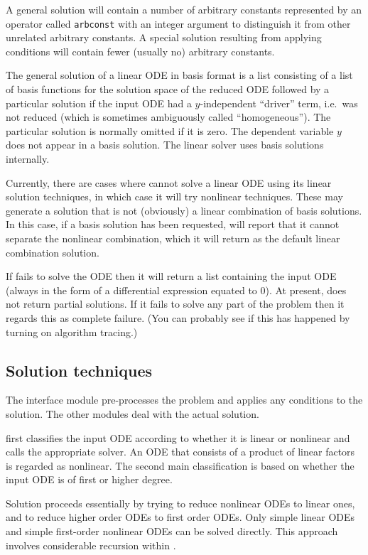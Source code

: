 A general solution will contain a number of arbitrary constants
represented by an operator called \texttt{arbconst} with an integer
argument to distinguish it from other unrelated arbitrary constants.
A special solution resulting from applying conditions will contain
fewer (usually no) arbitrary constants.

The general solution of a linear ODE in basis format is a list
consisting of a list of basis functions for the solution space of the
reduced ODE followed by a particular solution if the input ODE had a
$y$-independent ``driver'' term, i.e.\ was not reduced (which is
sometimes ambiguously called ``homogeneous'').  The particular
solution is normally omitted if it is zero.  The dependent variable
$y$ does not appear in a basis solution.  The linear solver uses basis
solutions internally.

Currently, there are cases where  cannot solve a linear ODE
using its linear solution techniques, in which case it will try
nonlinear techniques.  These may generate a solution that is not
(obviously) a linear combination of basis solutions.  In this case, if
a basis solution has been requested,  will report that it
cannot separate the nonlinear combination, which it will return as the
default linear combination solution.

If  fails to solve the ODE then it will return a list
containing the input ODE (always in the form of a differential
expression equated to 0).  At present,  does not return
partial solutions.  If it fails to solve any part of the problem then
it regards this as complete failure.  (You can probably see if this
has happened by turning on algorithm tracing.)


\subsection{Solution techniques}

The  interface module pre-processes the problem and applies
any conditions to the solution.  The other modules deal with the
actual solution.

 first classifies the input ODE according to whether it
is linear or nonlinear and calls the appropriate solver.  An ODE that
consists of a product of linear factors is regarded as nonlinear.  The
second main classification is based on whether the input ODE is of
first or higher degree.

Solution proceeds essentially by trying to reduce nonlinear ODEs to
linear ones, and to reduce higher order ODEs to first order ODEs.
Only simple linear ODEs and simple first-order nonlinear ODEs can be
solved directly.  This approach involves considerable recursion within
.

